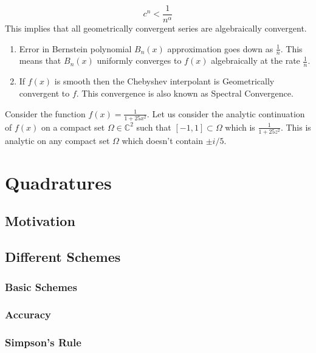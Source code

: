 \documentclass[
]{book}
\begin{document}
\[c^n<\frac{1}{n^{\alpha}}\]
This implies that all geometrically convergent series are algebraically convergent.

\begin{enumerate}
\def\labelenumi{\arabic{enumi}.}
\setcounter{enumi}{3}
\item
  Error in Bernstein polynomial \(B_n(x)\) approximation goes down as \(\frac{1}{n}\). This means that \(B_n(x)\) uniformly converges to \(f(x)\) algebraically at the rate \(\frac{1}{n}\).
\item
  If \(f(x)\) is smooth then the Chebyshev interpolant is Geometrically convergent to \(f\). This convergence is also known as Spectral Convergence.
\end{enumerate}

Consider the function \(f(x) = \frac{1}{1+25x^2}\). Let us consider the analytic continuation of \(f(x)\) on a compact set \(\Omega \in \mathbb{C}^2\) such that \([-1,1] \subset \Omega\) which is \(\frac{1}{1+25z^2}\). This is analytic on any compact set \(\Omega\) which doesn't contain \(\pm i/5\).

\hypertarget{quadratures}{%
\chapter{Quadratures}\label{quadratures}}

\hypertarget{motivation-2}{%
\section{Motivation}\label{motivation-2}}

\hypertarget{different-schemes}{%
\section{Different Schemes}\label{different-schemes}}

\hypertarget{basic-schemes}{%
\subsection{Basic Schemes}\label{basic-schemes}}

\hypertarget{accuracy}{%
\subsection{Accuracy}\label{accuracy}}

\hypertarget{simpsons-rule}{%
\subsection{Simpson's Rule}\label{simpsons-rule}}
\end{document}
